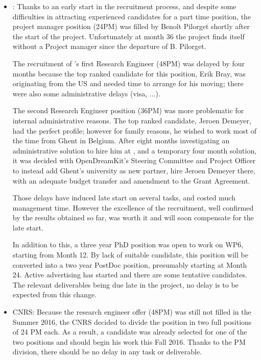 \documentclass{deliverablereport}
\begin{document}
\begin{itemize}
\item{:}
  Thanks to an early start in the recruitment process, and despite
  some difficulties in attracting experienced candidates for a part
  time position, the project manager position (24PM) was filled by
  Benoît Pilorget shortly after the start of the project. Unfortunately at month 36 the project
finds itself without a Project manager since the departure of B. Pilorget.

  The recruitment of 's first Research Engineer (48PM) was
  delayed by four months because the top ranked candidate for this
  position, Erik Bray, was originating from the US and needed time to
  arrange for his moving; there were also some administrative delays
  (visa, ...).

  The second Research Engineer position (36PM) was more problematic
  for internal administrative reasons. The top ranked candidate,
  Jeroen Demeyer, had the perfect profile; however for family reasons,
  he wished to work most of the time from Ghent in Belgium. After eight
  months investigating an administrative solution to hire him at
  , and a temporary four month solution, it was decided with
  OpenDreamKit's Steering Committee and Project Officer to instead add
  Ghent's university as new partner, hire Jeroen Demeyer there, with an
  adequate budget transfer and amendment to the Grant Agreement.

  Those delays have induced late start on several tasks, and costed
  much management time. However the excellence of the recruitment, well
  confirmed by the results obtained so far, was worth it and will soon
  compensate for the late start.

  In addition to this, a three year PhD position was open to work on
  WP6, starting from Month 12. By lack of suitable candidate, this
  position will be converted into a two year PostDoc position,
  presumably starting at Month 24. Active advertising has started and
  there are some tentative candidates. The relevant deliverables being
  due late in
  the project, no delay is to be expected from this change.\\

\item{CNRS:} Because the research engineer offer (48PM) was still not
  filled in the Summer 2016, the CNRS decided to divide the position
  in two full positions of 24 PM each. As a result, a candidate was
  already selected for one of the two positions and should begin his
  work this Fall 2016.  Thanks to the PM division, there should be no
  delay in any task or
  deliverable. \\


\end{itemize}
\end{document}
